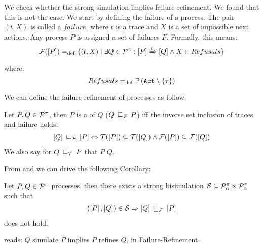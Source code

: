 We check whether the strong simulation implies failure-refinement. We found that this is not the case. We start by defining the failure of a process.
The pair $(t, X)$ is called a $failure$, where $t$ is a trace and $X$ is a set of impossible next actions. Any process
$P$ is assigned a set of failures $F$. Formally, this means:
\begin{align}
    \failures[P] \define \{(t,X) \mid \exists Q\in\procs: \ec{P} \bigstep{t} \ec{Q}\wedge X\in Refusals\}
\label{failure}
\end{align}
where: \[Refusals \define \pom{\actions\setminus\set{\tau}}\]

We can define the failure-refinement of \picalc{} processes as follow:

\begin{definition}
\label{def_failure_ref}
	Let $P,Q\in\mathcal P^{\pi}$, then $P$ is a  of $Q$ ($Q\refiF P$) iff the inverse set inclusion of traces and failure holds:
\begin{align}
   \ec{Q} \refiF \ec{P} \Leftrightarrow  \traces[P]\subseteq\traces[Q] \wedge \failures[P]\subseteq\failures[Q]
\end{align}
	We also say for $Q\refi{}P$ that $P$  $Q$.
\end{definition}

From  and  we can drive the following Corollary: 

\begin{cor}
\label{cor_sim_failure_refinement}
Let $P,Q\in\mathcal P^{\pi}$ processes, then there exists a  strong bisimulation $\mathcal{S}\subseteq\mathcal P^{\pi}_\alpha\times\mathcal P^{\pi}_\alpha$ such that
\begin{align}
    (\ec{P},\ec{Q})\in{}\simu  \Rightarrow \ec{Q} \refiF \ec{P}
   \label{failure_model}
\end{align}
does not hold.
\end{cor}%
reads:  $Q$ simulate $P$ implies $P$ refines $Q$, in Failure-Refinement.

